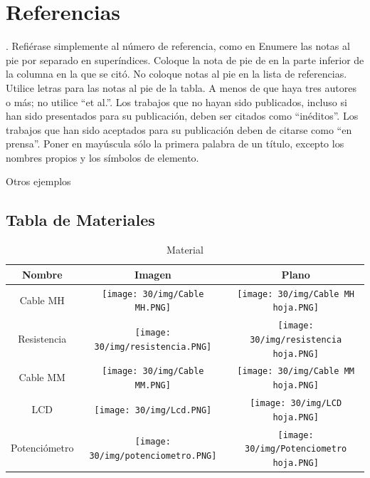     \section*{Referencias}


\cite{andrade2019estudio}.
\cite{RAE}
\cite{meyers2000estudios}
\cite{arteaga2020importancia}
    Refiérase simplemente al número de referencia, como en %
    Enumere las notas al pie por separado en superíndices. Coloque la nota de pie de en la parte inferior de la columna en la que se citó. No coloque notas al pie en la lista de referencias. Utilice letras para las notas al pie de la tabla.
    A menos de que haya tres autores o más; no utilice “et al.”. Los trabajos que no hayan sido publicados, incluso si han sido presentados para su publicación, deben ser citados como “inéditos”. Los trabajos que han sido aceptados para su publicación deben de citarse como “en prensa”. Poner en mayúscula sólo la primera palabra de un título, excepto los nombres propios y los símbolos de elemento. 

    Otros ejemplos %

\subsection{Tabla de Materiales}
\begin{table}[H]
    \centering
    \begin{tabular}{|c|c|c|}
    \hline
    Nombre & Imagen & Plano \\
    \hline
    Cable MH & \texttt{[image: 30/img/Cable MH.PNG]} & \texttt{[image: 30/img/Cable MH hoja.PNG]} \\
    \hline
    Resistencia & \texttt{[image: 30/img/resistencia.PNG]} & \texttt{[image: 30/img/resistencia hoja.PNG]} \\
    \hline
    Cable MM & \texttt{[image: 30/img/Cable MM.PNG]} & \texttt{[image: 30/img/Cable MM hoja.PNG]} \\
    \hline
    LCD & \texttt{[image: 30/img/Lcd.PNG]} & \texttt{[image: 30/img/LCD hoja.PNG]} \\
    \hline
    Potenciómetro & \texttt{[image: 30/img/potenciometro.PNG]} & \texttt{[image: 30/img/Potenciometro hoja.PNG]} \\
    \hline
    \end{tabular}
    \caption{Material}
    \label{tab:my_label}
\end{table}

